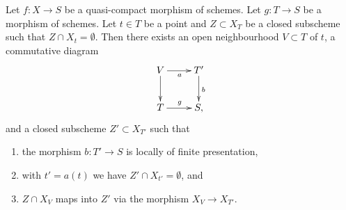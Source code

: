 \begin{lemma}
\label{lemma-separate}
Let $f : X \to S$ be a quasi-compact morphism of schemes.
Let $g : T \to S$ be a morphism of schemes.
Let $t \in T$ be a point and $Z \subset X_T$ be a closed
subscheme such that $Z \cap X_t = \emptyset$.
Then there exists an open neighbourhood
$V \subset T$ of $t$, a commutative diagram
$$
\xymatrix{
V \ar[d] \ar[r]_a & T' \ar[d]^b \\
T \ar[r]^g & S,
}
$$
and a closed subscheme $Z' \subset X_{T'}$ such that
\begin{enumerate}
\item the morphism $b : T' \to S$ is locally of finite presentation,
\item with $t' = a(t)$ we have $Z' \cap X_{t'} = \emptyset$, and
\item $Z \cap X_V$ maps into $Z'$ via the morphism $X_V \to X_{T'}$.
\end{enumerate}
\end{lemma}

